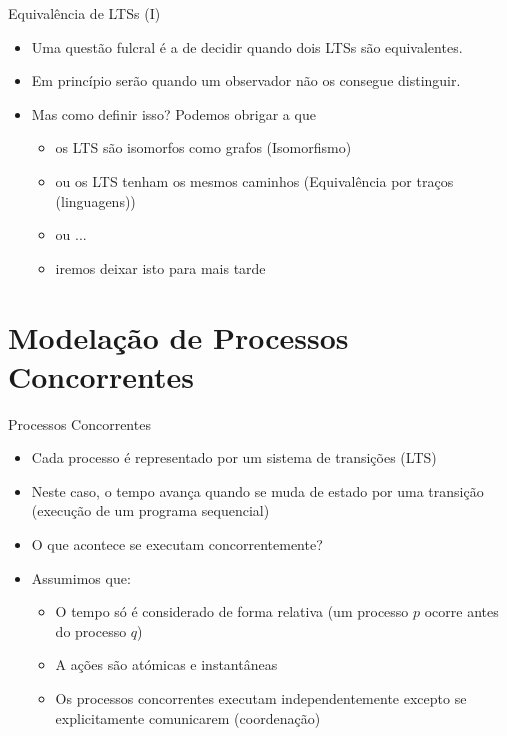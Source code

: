 \documentclass[aspectratio=169]{beamer}
\begin{document}
\begin{frame}{Equivalência de LTSs (I)}

\begin{itemize}
  \item 
Uma questão fulcral é a de decidir quando dois LTSs são equivalentes.
\item Em princípio serão quando um observador não os consegue distinguir. \item Mas como definir isso?
Podemos obrigar a que
\begin{itemize}
\item  os LTS são isomorfos como grafos (Isomorfismo)
\item ou os LTS tenham os mesmos caminhos (Equivalência por traços (linguagens))
\item ou ...
\item iremos deixar isto para mais tarde
\end{itemize}
\end{itemize}

\end{frame}
\section{Modelação de Processos Concorrentes}

\begin{frame}{Processos Concorrentes}
\begin{itemize}[<+->]
  \item Cada processo é representado por um sistema de transições (LTS) 
\item Neste caso, o tempo avança quando se muda de estado por uma transição (execução de um programa sequencial)

\item O que acontece se executam concorrentemente?
\item Assumimos que:
\begin{itemize}
  \item O tempo só é considerado de forma relativa (um processo $p$  ocorre antes do processo $q$)
  \item A ações são atómicas e instantâneas
  \item Os processos concorrentes executam independentemente excepto se explicitamente comunicarem (coordenação)
\end{itemize}
\end{itemize} 
\end{frame}
\end{document}
